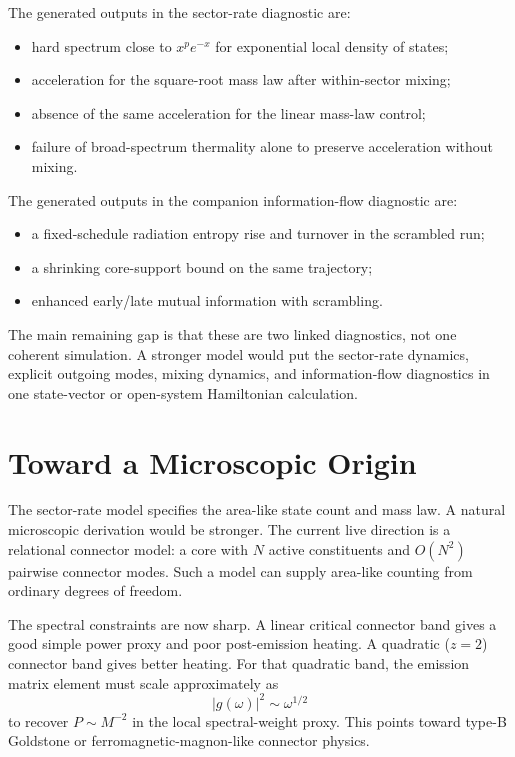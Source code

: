 \documentclass[aps,prd,onecolumn,longbibliography,nofootinbib]{revtex4-2}
\begin{document}
The generated outputs in the sector-rate diagnostic are:
\begin{itemize}[leftmargin=*]
    \item hard spectrum close to $x^p e^{-x}$ for exponential local density of
    states;
    \item acceleration for the square-root mass law after within-sector mixing;
    \item absence of the same acceleration for the linear mass-law control;
    \item failure of broad-spectrum thermality alone to preserve acceleration
    without mixing.
\end{itemize}

The generated outputs in the companion information-flow diagnostic are:
\begin{itemize}[leftmargin=*]
    \item a fixed-schedule radiation entropy rise and turnover in the
    scrambled run;
    \item a shrinking core-support bound on the same trajectory;
    \item enhanced early/late mutual information with scrambling.
\end{itemize}

The main remaining gap is that these are two linked diagnostics, not one
coherent simulation.  A stronger model would put the sector-rate dynamics,
explicit outgoing modes, mixing dynamics, and information-flow diagnostics in
one state-vector or open-system Hamiltonian calculation.

\section{Toward a Microscopic Origin}
\label{sec:microscopic}

The sector-rate model specifies the area-like state count and mass law.  A
natural microscopic derivation would be stronger.  The current live direction
is a relational connector model: a core with $N$ active constituents and
$O(N^2)$ pairwise connector modes.  Such a model can supply area-like counting
from ordinary degrees of freedom.

The spectral constraints are now sharp.  A linear critical connector band gives
a good simple power proxy and poor post-emission heating.  A quadratic
($z=2$) connector band gives better heating.  For that quadratic band, the
emission matrix element must scale approximately as
\begin{equation}
    |g(\omega)|^2\sim \omega^{1/2}
\end{equation}
to recover $P\sim M^{-2}$ in the local spectral-weight proxy.  This points
toward type-B Goldstone or ferromagnetic-magnon-like connector physics.
\end{document}
